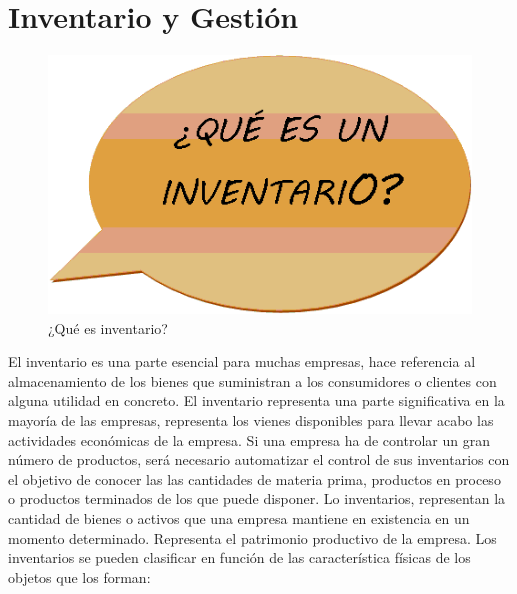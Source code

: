 \documentclass[a4paper,11pt]{book}
\begin{document}
\section{Inventario y Gestión}
\begin{figure}[H]  
\centering 
\includegraphics[scale=0.75]{imagenes/intro/INVENTARIO.png}
\caption{ ¿Qué es inventario?\cite{cuestion} }  
\end{figure} 

El inventario\cite{libro} es una parte esencial para muchas empresas, hace referencia al almacenamiento de los bienes que suministran a los consumidores o clientes con alguna utilidad en concreto. El inventario representa una parte significativa en la mayoría de las empresas, representa los vienes disponibles para llevar acabo las actividades económicas de la empresa.  Si una empresa ha de controlar un gran número de productos, será necesario automatizar el control de sus inventarios con el objetivo de conocer las las cantidades de materia prima, productos en proceso o productos terminados de los que puede disponer.  Lo inventarios, representan la cantidad de bienes o activos que una empresa mantiene en existencia en un momento determinado. Representa el patrimonio productivo de la empresa. Los inventarios se pueden clasificar en función de las característica físicas de los objetos que los forman: 
\end{document}

